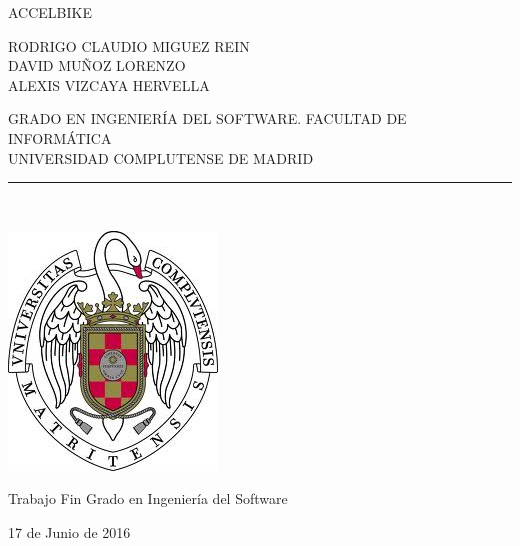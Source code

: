\begin{center}

   \vspace{1cm}


   {\Large ACCELBIKE}\\

   \vspace{0.5cm}



   \vspace{0.5cm}



   {\large RODRIGO CLAUDIO MIGUEZ REIN}\\
   {\large DAVID MUÑOZ LORENZO}\\
   {\large ALEXIS VIZCAYA HERVELLA}\\

   \vspace{0.5cm}




   GRADO EN INGENIERÍA DEL SOFTWARE. FACULTAD DE INFORMÁTICA\\
   UNIVERSIDAD COMPLUTENSE DE MADRID \\


   \vspace{0.65cm}
   \rule{2in}{0.5pt}\\
   \vspace{0.85cm}

  \includegraphics[height=2.5in]{figures/escudo.jpg}
  

   \vspace{0.5cm}
Trabajo Fin Grado en Ingeniería del Software

   \vspace{0.5cm}






  17 de Junio de 2016\\
   \vspace{1cm}

\end{center}

